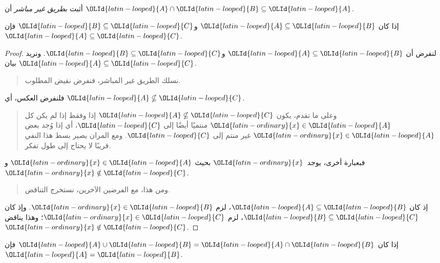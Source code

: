 \documentclass[../../../include/open-logic-section]{subfiles}
\begin{document}
\begin{prob}
أثبت \emph{بطريق غير مباشر} أن ${\OLId{latin-looped}{A}} \cap {\OLId{latin-looped}{B}} \subseteq {\OLId{latin-looped}{A}}$.
\end{prob}

\begin{prop}
إذا كان ${\OLId{latin-looped}{A}} \subseteq {\OLId{latin-looped}{B}}$ و${\OLId{latin-looped}{B}} \subseteq {\OLId{latin-looped}{C}}$ فإن ${\OLId{latin-looped}{A}} \subseteq {\OLId{latin-looped}{C}}$.
\end{prop}

\begin{proof}
  لنفرض أن ${\OLId{latin-looped}{A}} \subseteq {\OLId{latin-looped}{B}}$ و${\OLId{latin-looped}{B}} \subseteq {\OLId{latin-looped}{C}}$. ونريد بيان
  ${\OLId{latin-looped}{A}} \subseteq {\OLId{latin-looped}{C}}$.
  \begin{quote}
    نسلك الطريق غير المباشر، فنفرض نقيض المطلوب.
  \end{quote}
  فلنفرض العكس، أي ${\OLId{latin-looped}{A}} \nsubseteq {\OLId{latin-looped}{C}}$.
  \begin{quote}
    وعلى ما تقدم، يكون ${\OLId{latin-looped}{A}} \nsubseteq {\OLId{latin-looped}{C}}$ إذا وفقط إذا لم يكن كل
    ${\OLId{latin-ordinary}{x}} \in {\OLId{latin-looped}{A}}$ منتميًا أيضًا إلى ${\OLId{latin-looped}{C}}$، أي إذا وُجد بعض ${\OLId{latin-ordinary}{x}} \in {\OLId{latin-looped}{A}}$ غير
    منتم إلى ${\OLId{latin-looped}{C}}$. ومع المران يصير بسط هذا النفي قريبًا لا يحتاج إلى
    طول تفكر.
  \end{quote}
  فبعبارة أخرى، يوجد~${\OLId{latin-ordinary}{x}}$ بحيث ${\OLId{latin-ordinary}{x}} \in {\OLId{latin-looped}{A}}$ و${\OLId{latin-ordinary}{x}} \notin {\OLId{latin-looped}{C}}$.
  \begin{quote}
    ومن هذا، مع الفرضين الآخرين، نستخرج التناقض.
  \end{quote}
  إذ كان ${\OLId{latin-looped}{A}} \subseteq {\OLId{latin-looped}{B}}$، لزم ${\OLId{latin-ordinary}{x}} \in {\OLId{latin-looped}{B}}$. وإذ كان ${\OLId{latin-looped}{B}} \subseteq {\OLId{latin-looped}{C}}$،
  لزم ${\OLId{latin-ordinary}{x}} \in {\OLId{latin-looped}{C}}$؛ وهذا يناقض ${\OLId{latin-ordinary}{x}} \notin {\OLId{latin-looped}{C}}$.
\end{proof}

\begin{prop}
إذا كان ${\OLId{latin-looped}{A}} \cup {\OLId{latin-looped}{B}} = {\OLId{latin-looped}{A}} \cap {\OLId{latin-looped}{B}}$ فإن ${\OLId{latin-looped}{A}} = {\OLId{latin-looped}{B}}$.
\end{prop}
\end{document}
